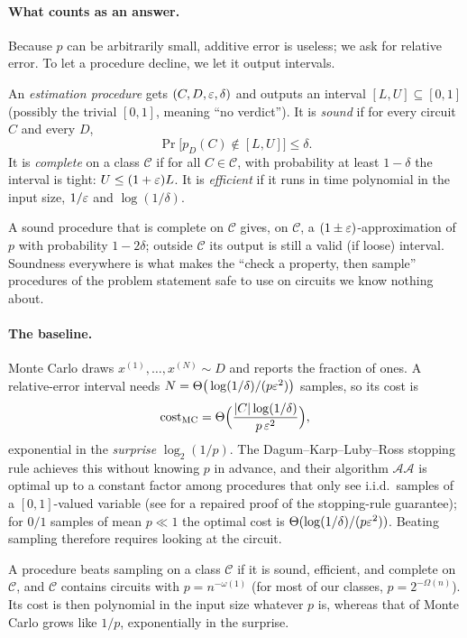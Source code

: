 \paragraph{What counts as an answer.}
Because $p$ can be arbitrarily small, additive error is useless; we ask for
relative error. To let a procedure decline, we let it output intervals.

\begin{definition}\label{def:sound}
An \emph{estimation procedure} gets $(C,D,\varepsilon,\delta)$ and outputs an
interval $[L,U]\subseteq[0,1]$ (possibly the trivial $[0,1]$, meaning ``no
verdict''). It is \emph{sound} if for every circuit $C$ and every $D$,
\[
\Pr\big[p_D(C)\notin[L,U]\big]\le\delta .
\]
It is \emph{complete} on a class $\mathcal C$ if for all $C\in\mathcal C$,
with probability at least $1-\delta$ the interval is tight:
$U\le(1+\varepsilon)L$. It is \emph{efficient} if it runs in time polynomial in the
input size, $1/\varepsilon$ and $\log(1/\delta)$.
\end{definition}

A sound procedure that is complete on $\mathcal C$ gives, on $\mathcal C$, a
$(1\pm\varepsilon)$-approximation of $p$ with probability $1-2\delta$; outside
$\mathcal C$ its output is still a valid (if loose) interval. Soundness
everywhere is what makes the ``check a property, then sample'' procedures of
the problem statement safe to use on circuits we know nothing about.

\paragraph{The baseline.}
Monte Carlo draws $x^{(1)},\dots,x^{(N)}\sim D$ and reports the fraction of
ones. A relative-error interval needs
$N=\Theta\big(\log(1/\delta)/(p\varepsilon^2)\big)$ samples, so its cost is
\[
\mathrm{cost}_{\mathrm{MC}}=\Theta\Big(\frac{|C|\log(1/\delta)}{p\,\varepsilon^2}\Big),
\]
exponential in the \emph{surprise} $\log_2(1/p)$. The
Dagum--Karp--Luby--Ross stopping rule achieves this without knowing $p$ in
advance, and their algorithm $\mathcal{AA}$ is optimal up to a constant factor
among procedures that only see i.i.d.\ samples of a $[0,1]$-valued variable
\cite{dklr2000} (see \cite{chen2007inverse} for a repaired proof of the stopping-rule
guarantee); for $0/1$ samples of mean $p\ll1$ the optimal cost is
$\Theta(\log(1/\delta)/(p\varepsilon^2))$. Beating sampling therefore requires looking at
the circuit.

\begin{definition}
A procedure beats sampling on a class $\mathcal C$ if it is sound, efficient,
and complete on $\mathcal C$, and $\mathcal C$ contains circuits with
$p=n^{-\omega(1)}$ (for most of our classes, $p=2^{-\Omega(n)}$). Its cost is then
polynomial in the input size whatever $p$ is, whereas that of Monte Carlo grows like
$1/p$, exponentially in the surprise.
\end{definition}


